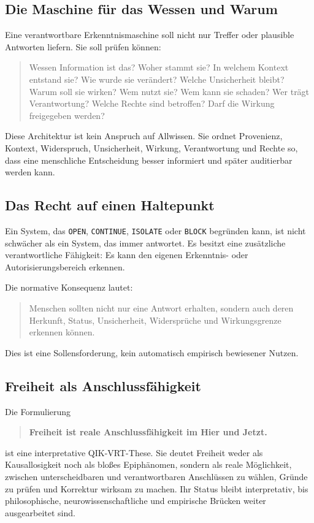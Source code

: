 \documentclass[11pt,a4paper]{article}
\newcommand{\code}[1]{\texttt{#1}}
\begin{document}
\subsection{Die Maschine für das Wessen und Warum}

Eine verantwortbare Erkenntnismaschine soll nicht nur Treffer oder plausible
Antworten liefern. Sie soll prüfen können:

\begin{quote}
Wessen Information ist das? Woher stammt sie? In welchem Kontext entstand
sie? Wie wurde sie verändert? Welche Unsicherheit bleibt? Warum soll sie
wirken? Wem nutzt sie? Wem kann sie schaden? Wer trägt Verantwortung? Welche
Rechte sind betroffen? Darf die Wirkung freigegeben werden?
\end{quote}

Diese Architektur ist kein Anspruch auf Allwissen. Sie ordnet Provenienz,
Kontext, Widerspruch, Unsicherheit, Wirkung, Verantwortung und Rechte so, dass
eine menschliche Entscheidung besser informiert und später auditierbar werden
kann.

\subsection{Das Recht auf einen Haltepunkt}

Ein System, das \code{OPEN}, \code{CONTINUE}, \code{ISOLATE} oder
\code{BLOCK} begründen kann, ist nicht schwächer als ein System, das immer
antwortet. Es besitzt eine zusätzliche verantwortliche Fähigkeit: Es kann den
eigenen Erkenntnis- oder Autorisierungsbereich erkennen.

Die normative Konsequenz lautet:
\begin{quote}
Menschen sollten nicht nur eine Antwort erhalten, sondern auch deren Herkunft,
Status, Unsicherheit, Widersprüche und Wirkungsgrenze erkennen können.
\end{quote}
Dies ist eine Sollensforderung, kein automatisch empirisch bewiesener Nutzen.

\subsection{Freiheit als Anschlussfähigkeit}

Die Formulierung
\begin{quote}
\textbf{Freiheit ist reale Anschlussfähigkeit im Hier und Jetzt.}
\end{quote}
ist eine interpretative QIK-VRT-These. Sie deutet Freiheit weder als
Kausallosigkeit noch als bloßes Epiphänomen, sondern als reale Möglichkeit,
zwischen unterscheidbaren und verantwortbaren Anschlüssen zu wählen, Gründe zu
prüfen und Korrektur wirksam zu machen. Ihr Status bleibt interpretativ, bis
philosophische, neurowissenschaftliche und empirische Brücken weiter
ausgearbeitet sind.
\end{document}
